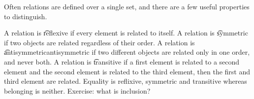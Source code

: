 %


Often relations are defined over a single set, and there are a few useful properties to distinguish.

A relation is \t{reflexive} if every element is related to itself.
A relation is \t{symmetric} if two objects are related regardless of their order.
A relation is \t{antisymmetric}{antisymmetric} if two different objects are related only in one order, and never both.
A relation is \t{transitive} if a first element is related to a second element and the second element is related to the third element, then the first and third element are related.
Equality is reflixive, symmetric and transitive whereas belonging is neither.
Exercise: what is inclusion?


%
%
